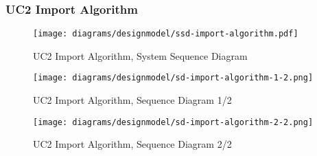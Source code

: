 \subsubsection{UC2 Import Algorithm}
\begin{figure}[H]
    \centering
    \texttt{[image: diagrams/designmodel/ssd-import-algorithm.pdf]}
    \caption{UC2 Import Algorithm, System Sequence Diagram}
    \label{fig:import-algorithm-ssd}
\end{figure}
\begin{figure}[p]%
  \begin{leftfullpage}
    \texttt{[image: diagrams/designmodel/sd-import-algorithm-1-2.png]}
    \caption{UC2 Import Algorithm, Sequence Diagram 1/2}
    \label{fig:import-algorithm-sd-1}
  \end{leftfullpage}
\end{figure}
\begin{figure}[p]%
  \begin{fullpage}
    \texttt{[image: diagrams/designmodel/sd-import-algorithm-2-2.png]}
    \caption{UC2 Import Algorithm, Sequence Diagram 2/2}
    \label{fig:import-algorithm-sd-2}
  \end{fullpage}
\end{figure}
% 

